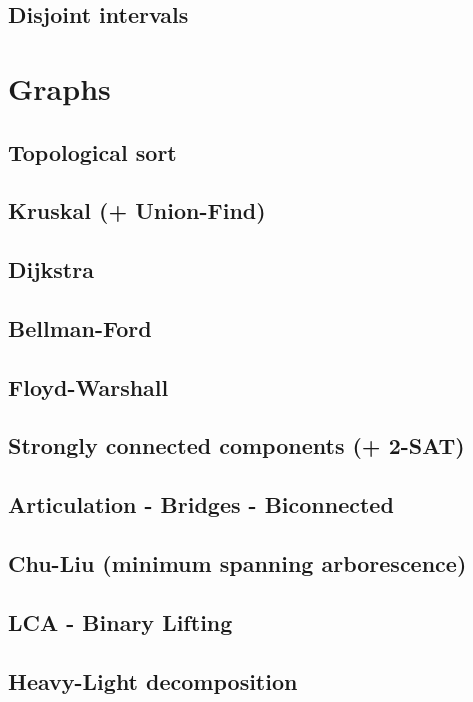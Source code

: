 \subsection{Disjoint intervals}

\section{Graphs}
\subsection{Topological sort}
\subsection{Kruskal (+ Union-Find)}
\subsection{Dijkstra}
\subsection{Bellman-Ford}
\subsection{Floyd-Warshall}
\subsection{Strongly connected components (+ 2-SAT)}
\subsection{Articulation - Bridges - Biconnected}
\subsection{Chu-Liu (minimum spanning arborescence)}
\subsection{LCA - Binary Lifting}
\subsection{Heavy-Light decomposition}
